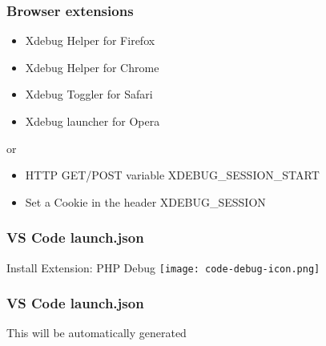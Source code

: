 \begin{frame}\frametitle{Browser extensions}
    \begin{itemize}
        \item Xdebug Helper for Firefox
        \item Xdebug Helper for Chrome
        \item Xdebug Toggler for Safari
        \item Xdebug launcher for Opera 
    \end{itemize} \pause
    or
    \begin{itemize}
        \item HTTP GET/POST variable XDEBUG\_SESSION\_START
        \item Set a Cookie in the header XDEBUG\_SESSION
    \end{itemize}
\end{frame}

\begin{frame}\frametitle{VS Code launch.json}
    Install Extension: PHP Debug \pause \texttt{[image: code-debug-icon.png]} \pause
    
\end{frame}

\begin{frame}\frametitle{VS Code launch.json}
    This will be automatically generated
    
    
\end{frame}